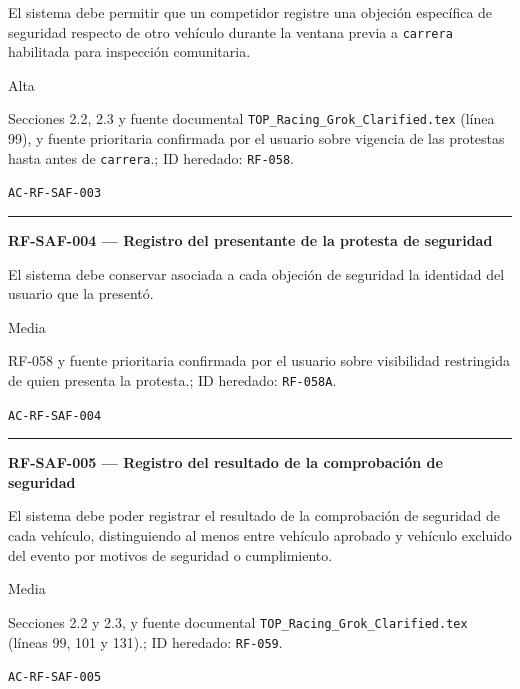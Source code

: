 \documentclass[10pt,letterpaper]{article}
\begin{document}
\begin{description}[style=nextline,leftmargin=3.15cm,labelwidth=2.8cm,font=\normalfont\bfseries]
\item[Obligación] El sistema debe permitir que un competidor registre una objeción específica de seguridad respecto de otro vehículo durante la ventana previa a \texttt{carrera} habilitada para inspección comunitaria.
\item[Prioridad] Alta
\item[Procedencia] Secciones 2.2, 2.3 y fuente documental \texttt{TOP\_Racing\_Grok\_Clarified.tex} (línea 99), y fuente prioritaria confirmada por el usuario sobre vigencia de las protestas hasta antes de \texttt{carrera}.; ID heredado: \texttt{RF-058}.
\item[Verificación] \texttt{AC-RF-SAF-003}
\end{description}
\vspace{0.25em}\hrule\vspace{0.65em}
\noindent\textbf{RF-SAF-004 --- Registro del presentante de la protesta de seguridad}\par
\begin{description}[style=nextline,leftmargin=3.15cm,labelwidth=2.8cm,font=\normalfont\bfseries]
\item[Obligación] El sistema debe conservar asociada a cada objeción de seguridad la identidad del usuario que la presentó.
\item[Prioridad] Media
\item[Procedencia] RF-058 y fuente prioritaria confirmada por el usuario sobre visibilidad restringida de quien presenta la protesta.; ID heredado: \texttt{RF-058A}.
\item[Verificación] \texttt{AC-RF-SAF-004}
\end{description}
\vspace{0.25em}\hrule\vspace{0.65em}
\noindent\textbf{RF-SAF-005 --- Registro del resultado de la comprobación de seguridad}\par
\begin{description}[style=nextline,leftmargin=3.15cm,labelwidth=2.8cm,font=\normalfont\bfseries]
\item[Obligación] El sistema debe poder registrar el resultado de la comprobación de seguridad de cada vehículo, distinguiendo al menos entre vehículo aprobado y vehículo excluido del evento por motivos de seguridad o cumplimiento.
\item[Prioridad] Media
\item[Procedencia] Secciones 2.2 y 2.3, y fuente documental \texttt{TOP\_Racing\_Grok\_Clarified.tex} (líneas 99, 101 y 131).; ID heredado: \texttt{RF-059}.
\item[Verificación] \texttt{AC-RF-SAF-005}
\end{description}
\end{document}
